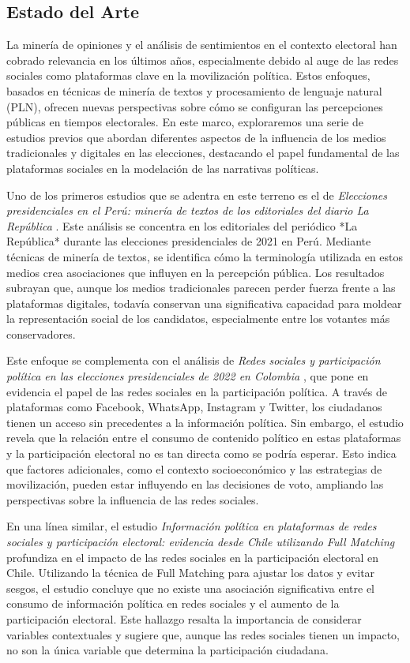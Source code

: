 \documentclass[10pt, a4paper]{article}
\begin{document}
	\subsection{Estado del Arte}
	La minería de opiniones y el análisis de sentimientos en el contexto electoral han cobrado relevancia en los últimos años, especialmente debido al auge de las redes sociales como plataformas clave en la movilización política. Estos enfoques, basados en técnicas de minería de textos y procesamiento de lenguaje natural (PLN), ofrecen nuevas perspectivas sobre cómo se configuran las percepciones públicas en tiempos electorales. En este marco, exploraremos una serie de estudios previos que abordan diferentes aspectos de la influencia de los medios tradicionales y digitales en las elecciones, destacando el papel fundamental de las plataformas sociales en la modelación de las narrativas políticas.
	
	Uno de los primeros estudios que se adentra en este terreno es el de \textit{Elecciones presidenciales en el Perú: minería de textos de los editoriales del diario La República} \parencite{Castro2021}. Este análisis se concentra en los editoriales del periódico *La República* durante las elecciones presidenciales de 2021 en Perú. Mediante técnicas de minería de textos, se identifica cómo la terminología utilizada en estos medios crea asociaciones que influyen en la percepción pública. Los resultados subrayan que, aunque los medios tradicionales parecen perder fuerza frente a las plataformas digitales, todavía conservan una significativa capacidad para moldear la representación social de los candidatos, especialmente entre los votantes más conservadores.
	
	Este enfoque se complementa con el análisis de \textit{Redes sociales y participación política en las elecciones presidenciales de 2022 en Colombia} \parencite{Ramirez2022}, que pone en evidencia el papel de las redes sociales en la participación política. A través de plataformas como Facebook, WhatsApp, Instagram y Twitter, los ciudadanos tienen un acceso sin precedentes a la información política. Sin embargo, el estudio revela que la relación entre el consumo de contenido político en estas plataformas y la participación electoral no es tan directa como se podría esperar. Esto indica que factores adicionales, como el contexto socioeconómico y las estrategias de movilización, pueden estar influyendo en las decisiones de voto, ampliando las perspectivas sobre la influencia de las redes sociales.
	
	En una línea similar, el estudio \textit{Información política en plataformas de redes sociales y participación electoral: evidencia desde Chile utilizando Full Matching} \parencite{Fernandez2020} profundiza en el impacto de las redes sociales en la participación electoral en Chile. Utilizando la técnica de Full Matching para ajustar los datos y evitar sesgos, el estudio concluye que no existe una asociación significativa entre el consumo de información política en redes sociales y el aumento de la participación electoral. Este hallazgo resalta la importancia de considerar variables contextuales y sugiere que, aunque las redes sociales tienen un impacto, no son la única variable que determina la participación ciudadana.
	
\end{document}
